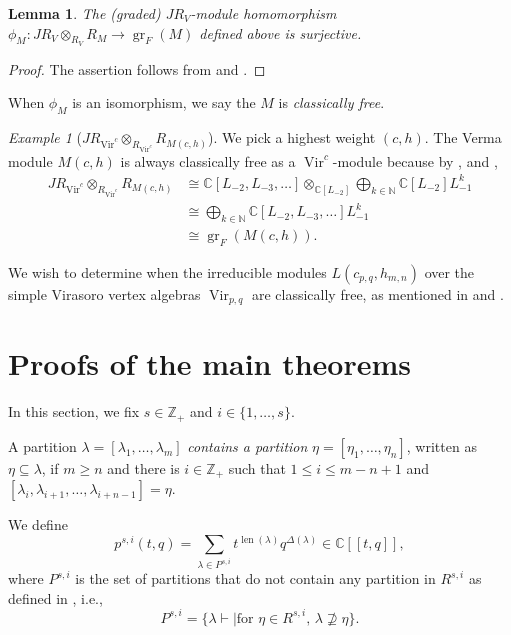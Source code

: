 \documentclass[a4paper, 12pt, reqno]{amsart}
\newtheorem{lemma}[theorem]{Lemma}
\theoremstyle{remark}
\newtheorem{example}[theorem]{Example}
\DeclareMathOperator{\Vir}{Vir}
\DeclareMathOperator{\len}{len}
\DeclareMathOperator{\gr}{gr}
\begin{document}
\begin{lemma}
  \label{lmm:8}
  The (graded) $JR_V$-module homomorphism $\phi_M: JR_V \otimes_{R_V} R_M \to \gr_F(M)$ defined above is surjective.
\end{lemma}

\begin{proof}
  The assertion follows from  and .
\end{proof}

When $\phi_M$ is an isomorphism, we say the $M$ is \emph{classically free}.

\begin{example}[$JR_{\Vir^c} \otimes_{R_{\Vir^c}} R_{M(c, h)}$]
  \label{exa:17}
  We pick a highest weight $(c, h)$.
  The Verma module $M(c, h)$ is always classically free as a $\Vir^c$-module because by ,  and ,
  \begin{align*}
    JR_{\Vir^c} \otimes_{R_{\Vir^c}} R_{M(c, h)} &\cong \mathbb{C}[L_{-2}, L_{-3}, \dots] \otimes_{\mathbb{C}[L_{-2}]} \bigoplus_{k \in \mathbb{N}}\mathbb{C}[L_{-2}]L_{-1}^k \\
                                                 &\cong \bigoplus_{k \in \mathbb{N}}\mathbb{C}[L_{-2}, L_{-3}, \dots]L_{-1}^k \\
                                                 &\cong \gr_F(M(c, h)).
  \end{align*}
\end{example}

We wish to determine when the irreducible modules $L(c_{p, q}, h_{m, n})$ over the simple Virasoro vertex algebras $\Vir_{p, q}$ are classically free, as mentioned in  and .

\section{Proofs of the main theorems}
\label{sec:proofs-main-theorems}

In this section, we fix $s \in \mathbb{Z}_+$ and $i \in \{1, \dots, s\}$.

A partition $\lambda = [\lambda_1, \dots, \lambda_m]$ \emph{contains a partition} $\eta = [\eta_1, \dots, \eta_n]$, written as $\eta \subseteq \lambda$, if $m \ge n$ and there is $i \in \mathbb{Z}_+$ such that $1 \le i \le m - n + 1$ and $[\lambda_i, \lambda_{i + 1}, \dots, \lambda_{i + n - 1}] = \eta$.

We define
\begin{equation*}
  p^{s, i}(t, q) = \sum_{\lambda \in P^{s, i}}t^{\len(\lambda)}q^{\Delta(\lambda)} \in \mathbb{C}[[t, q]],
\end{equation*}
where $P^{s, i}$ is the set of partitions that do not contain any partition in $R^{s, i}$ as defined in , i.e.,
\begin{equation*}
  P^{s, i} = \{\lambda \vdash \mid \text{for $\eta \in R^{s, i}$, $\lambda \nsupseteq \eta$}\}.
\end{equation*}
\end{document}
